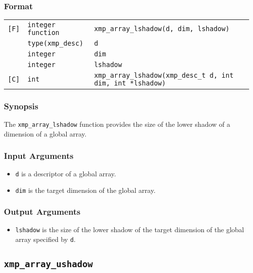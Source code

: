 \subsubsection*{Format}

\begin{tabular}{lll}

\verb![F]!& {\tt integer function}& {\tt xmp\_array\_lshadow(d, dim, lshadow)}\\
          & {\tt type(xmp\_desc)} & {\tt d}\\
          & {\tt integer} & {\tt dim}\\
          & {\tt integer} & {\tt lshadow}\\

\verb![C]!&  {\tt int}& {\tt xmp\_array\_lshadow(xmp\_desc\_t d, int dim, int *lshadow)}\\

\end{tabular}

\subsubsection*{Synopsis}

The {\tt xmp\_array\_lshadow} function provides the size of the lower shadow
of a dimension of a global array.


\subsubsection*{Input Arguments}
\begin{itemize}
 \item {\tt d} is a descriptor of a global array.
 \item {\tt dim} is the target dimension of the global array.
\end{itemize}

\subsubsection*{Output Arguments}
\begin{itemize}
 \item {\tt lshadow} is the size of the lower shadow of the target
       dimension of the global array specified by {\tt d}.
\end{itemize}


\subsection{\tt xmp\_array\_ushadow}

